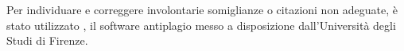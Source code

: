 %
%
%
%
%
%
%
%
%
%
%

\medskip

Per individuare e correggere involontarie somiglianze o citazioni non adeguate, è stato utilizzato \myAntiplagio, il software antiplagio messo a disposizione dall'Università degli Studi di Firenze.
